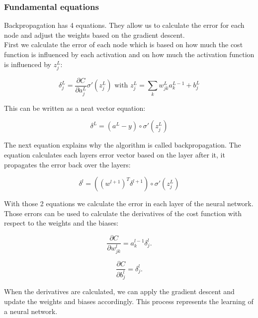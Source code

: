 		\subsubsection{Fundamental equations}

Backpropagation has 4 equations. They allow us to calculate the error for each node and adjust the weights based on the gradient descent. \\

First we calculate the error of each node which is based on how much the cost function is influenced by each activation and on how much the activation function is influenced by $z_j^L$:

\begin{equation} 
\delta^L_j = \frac{\partial C}{\partial a^L_j} \sigma'(z_j^L)
\text{ with }
z_j^L = \sum_k w^L_{jk}a^{L-1}_k+b^L_j
\end{equation}

\noindent This can be written as a neat vector equation:

\begin{equation} 
\delta^L = (a^L-y) \circ \sigma'(z_j^L)
\end{equation}

\noindent The next equation explains why the algorithm is called backpropagation. The equation calculates each layers error vector based on the layer after it, it propagates the error back over the layers:

\begin{equation} 
\delta^l = ((w^{l+1})^T\delta^{l+1}) \circ \sigma'(z_j^L)
\end{equation}

\noindent With those 2 equations we calculate the error in each layer of the neural network. Those errors can be used to calculate the derivatives of the cost function with respect to the weights and the biases:

\begin{equation} 
\frac{\partial C}{\partial w^l_{jk}} = a^{l-1}_k \delta^l_j.
\end{equation}

\begin{equation} 
\frac{\partial C}{\partial b^l_j} = \delta^l_j.
\end{equation}

\noindent When the derivatives are calculated, we can apply the gradient descent and update the weights and biases accordingly. This process represents the learning of a neural network.


